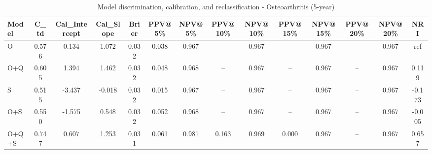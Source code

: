 \begin{table}[htbp]
\centering
\small
\caption{Model discrimination, calibration, and reclassification - Osteoarthritis (5-year)}
\label{tab:perf_osteoarthritis_5y}
\begin{tabular}{lccccccccccccc}
\toprule
Model & C\_td & Cal\_Intercept & Cal\_Slope & Brier & PPV@5\% & NPV@5\% & PPV@10\% & NPV@10\% & PPV@15\% & NPV@15\% & PPV@20\% & NPV@20\% & NRI \\
\midrule
O & 0.576 & 0.134 & 1.072 & 0.032 & 0.038 & 0.967 & -- & 0.967 & -- & 0.967 & -- & 0.967 & ref \\
O+Q & 0.605 & 1.394 & 1.462 & 0.032 & 0.048 & 0.968 & -- & 0.967 & -- & 0.967 & -- & 0.967 & 0.119 \\
S & 0.515 & -3.437 & -0.018 & 0.032 & 0.015 & 0.967 & -- & 0.967 & -- & 0.967 & -- & 0.967 & -0.173 \\
O+S & 0.550 & -1.575 & 0.548 & 0.032 & 0.052 & 0.968 & -- & 0.967 & -- & 0.967 & -- & 0.967 & -0.005 \\
O+Q+S & 0.747 & 0.607 & 1.253 & 0.031 & 0.061 & 0.981 & 0.163 & 0.969 & 0.000 & 0.967 & -- & 0.967 & 0.657 \\
\bottomrule
\end{tabular}
\end{table}